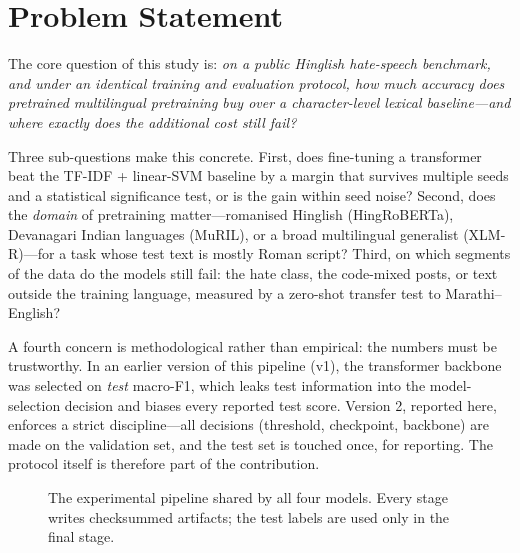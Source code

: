 \section{Problem Statement}
\label{sec:problem}

The core question of this study is: \emph{on a public Hinglish hate-speech
benchmark, and under an identical training and evaluation protocol, how much
accuracy does pretrained multilingual pretraining buy over a character-level
lexical baseline---and where exactly does the additional cost still fail?}

Three sub-questions make this concrete. First, does fine-tuning a transformer
beat the TF-IDF + linear-SVM baseline by a margin that survives multiple seeds and
a statistical significance test, or is the gain within seed noise? Second, does
the \emph{domain} of pretraining matter---romanised Hinglish (HingRoBERTa),
Devanagari Indian languages (MuRIL), or a broad multilingual generalist
(XLM-R)---for a task whose test text is mostly Roman script? Third, on which
segments of the data do the models still fail: the hate class, the code-mixed
posts, or text outside the training language, measured by a zero-shot transfer
test to Marathi--English?

A fourth concern is methodological rather than empirical: the numbers must be
trustworthy. In an earlier version of this pipeline (v1), the transformer backbone
was selected on \emph{test} macro-F1, which leaks test information into the
model-selection decision and biases every reported test score. Version 2, reported
here, enforces a strict discipline---all decisions (threshold, checkpoint, backbone)
are made on the validation set, and the test set is touched once, for reporting.
The protocol itself is therefore part of the contribution.

\begin{figure}[htbp]
\centering
{}
\caption[The experimental pipeline shared by all four models]{The experimental pipeline shared by all four models. Every stage writes
checksummed artifacts; the test labels are used only in the final stage.}
\label{fig:pipeline}
\end{figure}

